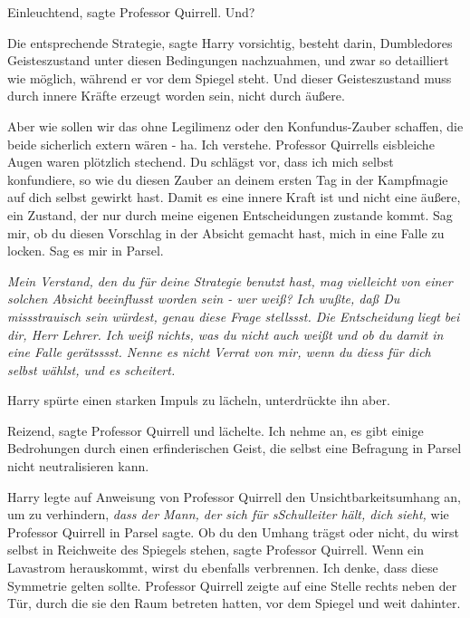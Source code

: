 \glqq{}Einleuchtend\grqq{}, sagte Professor Quirrell. \glqq{}Und?\grqq{}

\glqq{}Die entsprechende Strategie\grqq{}, sagte Harry vorsichtig, \glqq{}besteht
darin, Dumbledores Geisteszustand unter diesen Bedingungen nachzuahmen, und zwar
so detailliert wie möglich, während er vor dem Spiegel steht. Und dieser
Geisteszustand muss durch innere Kräfte erzeugt worden sein, nicht durch
äußere.\grqq{}

\glqq{}Aber wie sollen wir das ohne Legilimenz oder den Konfundus-Zauber
schaffen, die beide sicherlich extern wären - ha. Ich verstehe.\grqq{} Professor
Quirrells eisbleiche Augen waren plötzlich stechend. \glqq{}Du schlägst vor, dass
ich mich selbst konfundiere, so wie du diesen Zauber an deinem ersten Tag in der
Kampfmagie auf dich selbst gewirkt hast. Damit es eine innere Kraft ist und
nicht eine äußere, ein Zustand, der nur durch meine eigenen Entscheidungen
zustande kommt. Sag mir, ob du diesen Vorschlag in der Absicht gemacht hast,
mich in eine Falle zu locken. Sag es mir in Parsel.\grqq{}

\glqq{}\emph{Mein Verstand, den du für deine Strategie benutzt hast, mag
vielleicht von einer solchen Absicht beeinflusst worden sein - wer weiß? Ich
wußte, daß Du missstrauisch sein würdest, genau diese Frage stellssst. Die
Entscheidung liegt bei dir, Herr Lehrer. Ich weiß nichts, was du nicht auch
weißt und ob du damit in eine Falle gerätsssst. Nenne es nicht Verrat von mir,
wenn du diess für dich selbst wählst, und es scheitert.}\grqq{}

Harry spürte einen starken Impuls zu lächeln, unterdrückte ihn aber.

\glqq{}Reizend\grqq{}, sagte Professor Quirrell und lächelte. \glqq{}Ich nehme an,
es gibt einige Bedrohungen durch einen erfinderischen Geist, die selbst eine
Befragung in Parsel nicht neutralisieren kann.\grqq{}

Harry legte auf Anweisung von Professor Quirrell den Unsichtbarkeitsumhang an,
um zu verhindern, \emph{dass der Mann, der sich für sSchulleiter hält, dich
sieht,} wie Professor Quirrell in Parsel sagte. \glqq{}Ob du den Umhang trägst
oder nicht, du wirst selbst in Reichweite des Spiegels stehen\grqq{}, sagte
Professor Quirrell. \glqq{}Wenn ein Lavastrom herauskommt, wirst du ebenfalls
verbrennen. Ich denke, dass diese Symmetrie gelten sollte.\grqq{} Professor
Quirrell zeigte auf eine Stelle rechts neben der Tür, durch die sie den Raum
betreten hatten, vor dem Spiegel und weit dahinter.

